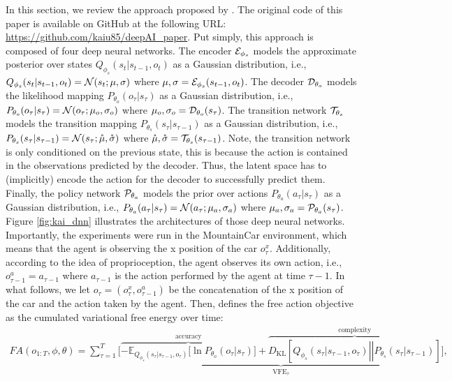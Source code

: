\documentclass[twoside,11pt]{article}
\let\oldmathcal\mathcal
\renewcommand{\mathcal}[1]{%
  \IfSubStr{ABCDEFGHIJKLMNOPQRSTUVWXYZ}{#1}{\oldmathcal{#1}}{\mathdutchcal{#1}}
}
\newcommand{\kl}[2]{D_{\mathrm{KL}} \left[ \left. \left. #1 \right|\right| #2 \right] }
\begin{document}
In this section, we review the approach proposed by \citet{DAI_Kai}. The original code of this paper is available on GitHub at the following URL: \url{https://github.com/kaiu85/deepAI_paper}. Put simply, this approach is composed of four deep neural networks. The encoder $\mathcal{E}_{\phi_s}$ models the approximate posterior over states $Q_{\phi_s}(s_t|s_{t-1}, o_t)$ as a Gaussian distribution, i.e., $Q_{\phi_s}(s_t|s_{t-1}, o_t) = \mathcal{N}(s_t;\mu, \sigma)$ where $\mu, \sigma = \mathcal{E}_{\phi_s}(s_{t-1}, o_t)$. The decoder $\mathcal{D}_{\theta_o}$ models the likelihood mapping $P_{\theta_o}(o_\tau|s_\tau)$ as a Gaussian distribution, i.e., $P_{\theta_o}(o_\tau|s_\tau) = \mathcal{N}(o_\tau;\mu_o, \sigma_o)$ where $\mu_o, \sigma_o = \mathcal{D}_{\theta_o}(s_\tau)$. The transition network $\mathcal{T}_{\theta_s}$ models the transition mapping $P_{\theta_s}(s_\tau|s_{\tau-1})$ as a Gaussian distribution, i.e., $P_{\theta_s}(s_\tau|s_{\tau-1}) = \mathcal{N}(s_\tau;\mathring{\mu}, \mathring{\sigma})$ where $\mathring{\mu}, \mathring{\sigma} = \mathcal{T}_{\theta_s}(s_{\tau-1})$. Note, the transition network is only conditioned on the previous state, this is because the action is contained in the observations predicted by the decoder. Thus, the latent space has to (implicitly) encode the action for the decoder to successfully predict them. Finally, the policy network $\mathcal{P}_{\theta_a}$ models the prior over actions $P_{\theta_a}(a_\tau|s_\tau)$ as a Gaussian distribution, i.e., $P_{\theta_a}(a_\tau|s_\tau) = \mathcal{N}(a_\tau;\mu_a, \sigma_a)$ where $\mu_a, \sigma_a = \mathcal{P}_{\theta_a}(s_\tau)$. Figure \ref{fig:kai_dnn} illustrates the architectures of those deep neural networks. Importantly, the experiments were run in the MountainCar environment, which means that the agent is observing the x position of the car $o_\tau^x$. Additionally, according to the idea of proprioception, the agent observes its own action, i.e., $o^a_{\tau-1} = a_{\tau-1}$ where $a_{\tau-1}$ is the action performed by the agent at time $\tau-1$. In what follows, we let $o_\tau = (o^x_\tau, o^a_{\tau-1})$ be the concatenation of the x position of the car and the action taken by the agent. Then, \citet{DAI_Kai} defines the free action objective as the cumulated variational free energy over time:
\begin{align*}
FA(o_{1:T}, \phi, \theta) = \sum_{\tau = 1}^T \Bigg[\underbrace{\overbrace{- \mathbb{E}_{Q_{\phi_s}(s_\tau|s_{\tau-1}, o_\tau)}\Big[\ln P_{\theta_o}(o_\tau|s_\tau)\Big]}^{\text{accuracy}} + \overbrace{\kl{Q_{\phi_s}(s_\tau|s_{\tau-1}, o_\tau)}{P_{\theta_s}(s_\tau|s_{\tau-1})}}^{\text{complexity}} }_{\text{VFE}_\tau}\Bigg],
\end{align*}
\end{document}
